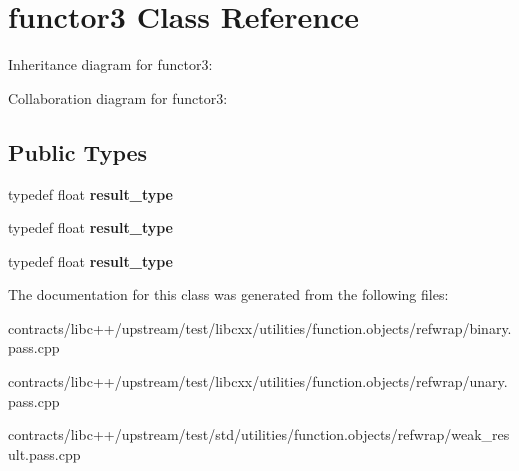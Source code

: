 \hypertarget{classfunctor3}{}\section{functor3 Class Reference}
\label{classfunctor3}


Inheritance diagram for functor3\+:


Collaboration diagram for functor3\+:
\subsection*{Public Types}
\begin{DoxyCompactItemize}
\item 
\mbox{\label{classfunctor3_a879249e3f0de620a8e87ec475d45947f}} 
typedef float {\bfseries result\+\_\+type}
\item 
\mbox{\label{classfunctor3_a879249e3f0de620a8e87ec475d45947f}} 
typedef float {\bfseries result\+\_\+type}
\item 
\mbox{\label{classfunctor3_a879249e3f0de620a8e87ec475d45947f}} 
typedef float {\bfseries result\+\_\+type}
\end{DoxyCompactItemize}


The documentation for this class was generated from the following files\+:\begin{DoxyCompactItemize}
\item 
contracts/libc++/upstream/test/libcxx/utilities/function.\+objects/refwrap/binary.\+pass.\+cpp\item 
contracts/libc++/upstream/test/libcxx/utilities/function.\+objects/refwrap/unary.\+pass.\+cpp\item 
contracts/libc++/upstream/test/std/utilities/function.\+objects/refwrap/weak\+\_\+result.\+pass.\+cpp\end{DoxyCompactItemize}

